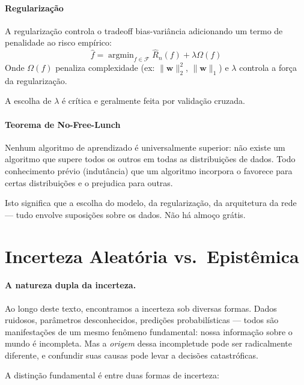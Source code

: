 \documentclass{tufte-handout}
\DeclareMathOperator*{\argmin}{argmin}
\begin{document}
\paragraph{Regularização}

A regularização controla o tradeoff bias-variância adicionando um termo de penalidade
ao risco empírico:
\[
\hat{f} = \argmin_{f \in \mathcal{F}} \hat{R}_n(f) + \lambda \Omega(f)
\]
Onde $\Omega(f)$ penaliza complexidade (ex: $\|\mathbf{w}\|_2^2$, $\|\mathbf{w}\|_1$)
e $\lambda$ controla a força da regularização.

A escolha de $\lambda$ é crítica e geralmente feita por validação cruzada.

\paragraph{Teorema de No-Free-Lunch}

Nenhum algoritmo de aprendizado é universalmente superior: não existe um algoritmo que
supere todos os outros em todas as distribuições de dados. Todo conhecimento prévio
(indutância) que um algoritmo incorpora o favorece para certas distribuições e o
prejudica para outras.

Isto significa que a escolha do modelo, da regularização, da arquitetura da rede ---
tudo envolve suposições sobre os dados. Não há almoço grátis.

\section{Incerteza Aleatória vs.\ Epistêmica}

\paragraph{A natureza dupla da incerteza.}

Ao longo deste texto, encontramos a incerteza sob diversas formas. Dados ruidosos,
parâmetros desconhecidos, predições probabilísticas --- todos são manifestações de um
mesmo fenômeno fundamental: nossa informação sobre o mundo é incompleta. Mas a
\textit{origem} dessa incompletude pode ser radicalmente diferente, e confundir suas
causas pode levar a decisões catastróficas.

A distinção fundamental é entre duas formas de incerteza:
\end{document}
